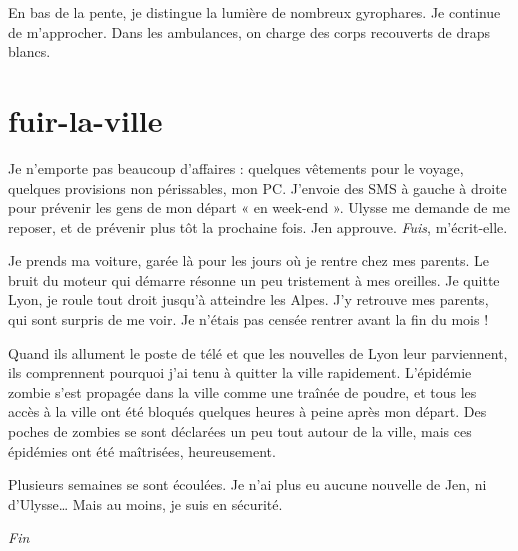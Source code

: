 En bas de la pente, je distingue la lumière de nombreux gyrophares. Je continue de m'approcher. Dans les ambulances, on charge des corps recouverts de draps blancs.
 

\section{fuir-la-ville}

Je n'emporte pas beaucoup d'affaires : quelques vêtements pour le voyage, quelques provisions non périssables, mon PC. J'envoie des SMS à gauche à droite pour prévenir les gens de mon départ « en week-end ». Ulysse me demande de me reposer, et de prévenir plus tôt la prochaine fois. Jen approuve. \textit{Fuis}, m'écrit-elle.

Je prends ma voiture, garée là pour les jours où je rentre chez mes parents. Le bruit du moteur qui démarre résonne un peu tristement à mes oreilles. Je quitte Lyon, je roule tout droit jusqu'à atteindre les Alpes. J'y retrouve mes parents, qui sont surpris de me voir. Je n'étais pas censée rentrer avant la fin du mois !

Quand ils allument le poste de télé et que les nouvelles de Lyon leur parviennent, ils comprennent pourquoi j'ai tenu à quitter la ville rapidement. L'épidémie zombie s'est propagée dans la ville comme une traînée de poudre, et tous les accès à la ville ont été bloqués quelques heures à peine après mon départ. Des poches de zombies se sont déclarées un peu tout autour de la ville, mais ces épidémies ont été maîtrisées, heureusement.

Plusieurs semaines se sont écoulées. Je n'ai plus eu aucune nouvelle de Jen, ni d'Ulysse… Mais au moins, je suis en sécurité.

\begin{center}
\textit{Fin}
\end{center}





